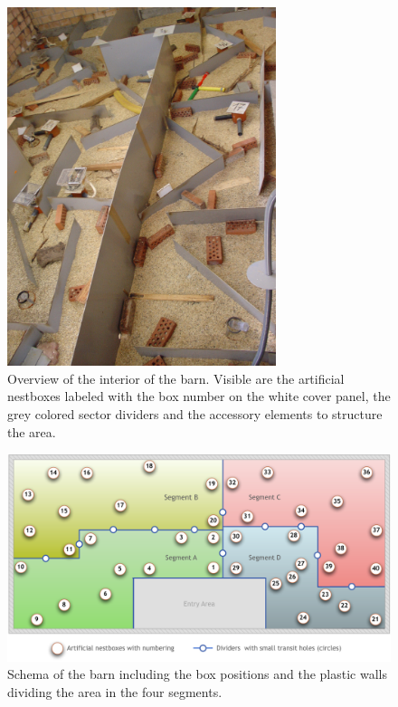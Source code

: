 \begin{figure}[htpb]
\begin{center}
  \includegraphics[width=0.7\textwidth]{assets/pdf/shed_overview.pdf}
  \caption[Interior of the barn]{Overview of the interior of the barn. Visible are the artificial nestboxes labeled with the box number on the white cover panel, the grey colored sector dividers and the accessory elements to structure the area.}
  \label{fig:shedoverview}
\end{center}
\end{figure}

\begin{figure}
  \includegraphics[width=\textwidth]{assets/pdf/shed_schema.pdf}
  \caption[Schema of the barn]{Schema of the barn including the box positions and the plastic walls dividing the area in the four segments. }
  \label{fig:shedschema}
\end{figure}